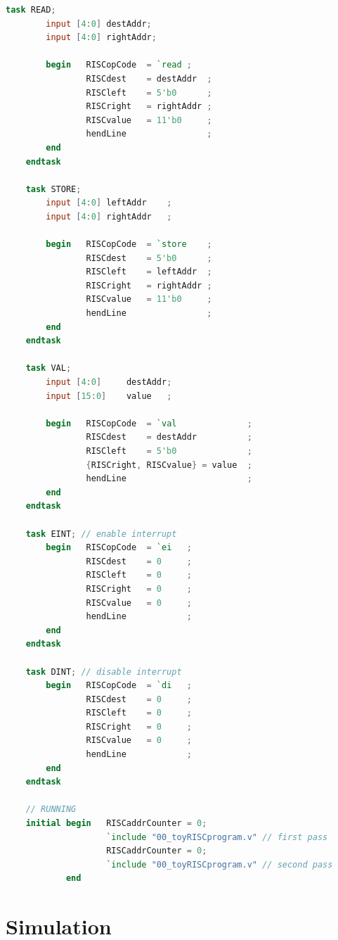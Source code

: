{\begin{shaded*}
\begin{lstlisting}[language=Verilog]
    task READ;
        input [4:0] destAddr;
        input [4:0] rightAddr;

        begin   RISCopCode  = `read ;
                RISCdest    = destAddr  ;
                RISCleft    = 5'b0      ;
                RISCright   = rightAddr ;
                RISCvalue   = 11'b0     ;
                hendLine                ;
        end
    endtask

    task STORE;
        input [4:0] leftAddr    ;
        input [4:0] rightAddr   ;

        begin   RISCopCode  = `store    ;
                RISCdest    = 5'b0      ;
                RISCleft    = leftAddr  ;
                RISCright   = rightAddr ;
                RISCvalue   = 11'b0     ;
                hendLine                ;
        end
    endtask

    task VAL;
        input [4:0]     destAddr;
        input [15:0]    value   ;

        begin   RISCopCode  = `val              ;
                RISCdest    = destAddr          ;
                RISCleft    = 5'b0              ;
                {RISCright, RISCvalue} = value  ;
                hendLine                        ;
        end
    endtask

    task EINT; // enable interrupt
        begin   RISCopCode  = `ei   ;
                RISCdest    = 0     ;
                RISCleft    = 0     ;
                RISCright   = 0     ;
                RISCvalue   = 0     ;
                hendLine            ;
        end
    endtask

    task DINT; // disable interrupt
        begin   RISCopCode  = `di   ;
                RISCdest    = 0     ;
                RISCleft    = 0     ;
                RISCright   = 0     ;
                RISCvalue   = 0     ;
                hendLine            ;
        end
    endtask

    // RUNNING
    initial begin   RISCaddrCounter = 0;
                    `include "00_toyRISCprogram.v" // first pass
                    RISCaddrCounter = 0;
                    `include "00_toyRISCprogram.v" // second pass
            end
 \end{lstlisting}
\end{shaded*}
}


\section{Simulation}


